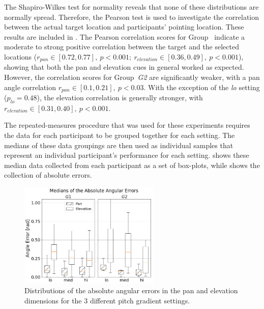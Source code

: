 \documentclass[acmsmall]{acmart}
\begin{document}
The Shapiro-Wilkes test for normality reveals that none of these distributions are normally spread. Therefore, the Pearson test is used to investigate the correlation between the actual target location and participants' pointing location.
These results are included in .
The Pearson correlation scores for Group~ indicate a moderate to strong positive correlation between the target and the selected locations ($r_{pan} \in [0.72, 0.77],~p < 0.001;~r_{elevation} \in [0.36, 0.49],~p < 0.001$), showing that both the pan and elevation cues in general worked as expected.
However, the correlation scores for Group~\textit{G2} are significantly weaker, with a pan angle correlation $r_{pan} \in [0.1, 0.21],~p < 0.03$.
With the exception of the \textit{lo} setting ($p_{lo} = 0.48$), the elevation correlation is generally stronger, with $r_{elevation} \in [0.31, 0.40],~p < 0.001$.

The repeated-measures procedure that was used for these experiments requires the data for each participant to be grouped together for each setting.
The medians of these data groupings are then used as individual samples that represent an individual participant's performance for each setting.
 shows these median data collected from each participant as a set of box-plots, while  shows the collection of absolute errors.

\begin{figure}
  \centering
  \includegraphics[width=0.6\textwidth]{figures/boxplot_target_search_absolute_median_error.png}
  \caption{Distributions of the absolute angular errors in the pan and elevation dimensions for the 3 different pitch gradient settings. }\label{fig:target-boxplot-absolute-errors}
\end{figure}
\end{document}
